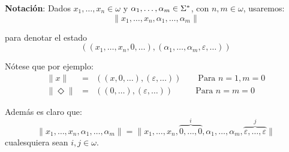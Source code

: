 \begin{frame}
	\textbf{Notación}: Dados $x_{1}, \dotsc, x_{n} \in \omega$ y $\alpha_{1}, \dotsc,\alpha_{m} \in \Sigma^{\ast}$, con $n, m \in
	\omega $, usaremos:
	\begin{equation*}
		\lVert x_{1}, \dotsc, x_{n}, \alpha_{1}, \dotsc, \alpha_{m} \rVert
	\end{equation*}

	\PN para denotar el estado
	\begin{equation*}
		\left((x_{1}, \dotsc, x_{n}, 0, \dotsc), (\alpha_{1}, \dotsc, \alpha_{m}, \varepsilon, \dotsc)\right)
	\end{equation*}

	\PN Nótese que por ejemplo:
	\begin{eqnarray*}
	\lVert x \rVert &=& \left((x, 0, \dotsc), (\varepsilon, \dotsc)\right) \qquad \text{Para } n = 1, m = 0 \\
	\lVert \Diamond \rVert &=& \left((0, \dotsc), (\varepsilon, \dotsc)\right) \qquad \ \ \; \text{Para } n = m = 0
	\end{eqnarray*}

	\PN Además es claro que:
	\[
		\lVert x_{1}, \dotsc, x_{n}, \alpha_{1}, \dotsc, \alpha_{m} \rVert = \lVert x_{1}, \dotsc, x_{n},
		\overset{i}{\overbrace{0, \dotsc, 0}}, \alpha_{1}, \dotsc, \alpha_{m}, \overset{j}{\overbrace{\varepsilon, \dotsc,
		\varepsilon}} \rVert
	\]
	cualesquiera sean $i, j \in \omega$.
\end{frame}
